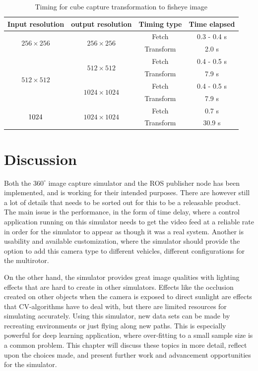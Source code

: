 \begin{table}[!htb]
    \centering
    \begin{tabular}{|c|c|c|c|} \hline
        \textbf{Input resolution} & \textbf{output resolution} & \textbf{Timing type} & \textbf{Time elapsed} \\ \hline \hline
        \multirow{2}{*}{$256 \times 256$} & \multirow{2}{*}{$256 \times 256$} & Fetch & 0.3 - 0.4 s\\ \cline{3-4}
         & & Transform & 2.0 s\\ \hline
        \multirow{4}{*}{$512 \times 512$} & \multirow{2}{*}{$512 \times 512$} & Fetch & 0.4 - 0.5 s \\ \cline{3-4}
         & & Transform & 7.9 s\\ \cline{2-4}
         & \multirow{2}{*}{$1024 \times 1024$} & Fetch & 0.4 - 0.5 s\\ \cline{3-4}
         & & Transform & 7.9 s\\ \hline
        \multirow{2}{*}{$1024 \time 1024$} & \multirow{2}{*}{$1024 \times 1024$} & Fetch & 0.7 s\\ \cline{3-4}
         & & Transform & 30.9 s\\ \hline
    \end{tabular}
    \caption{Timing for cube capture transformation to fisheye image}
    \label{tab:res_timing_cube_capture}
\end{table}


\section{Discussion}

Both the $360^\circ$ image capture simulator and the ROS publisher node has been implemented, and is working for their intended purposes. There are however still a lot of details that needs to be sorted out for this to be a releasable product. The main issue is the performance, in the form of time delay, where a control application running on this simulator needs to get the video feed at a reliable rate in order for the simulator to appear as though it was a real system. Another is usability and available customization, where the simulator should provide the option to add this camera type to different vehicles, different configurations for the multirotor.

On the other hand, the simulator provides great image qualities with lighting effects that are hard to create in other simulators. Effects like the occlusion created on other objects when the camera is exposed to direct sunlight are effects that CV-algorithms have to deal with, but there are limited resources for simulating accurately. Using this simulator, new data sets can be made by recreating environments or just flying along new paths. This is especially powerful for deep learning application, where over-fitting to a small sample size is a common problem. This chapter will discuss these topics in more detail, reflect upon the choices made, and present further work and advancement opportunities for the simulator. 

